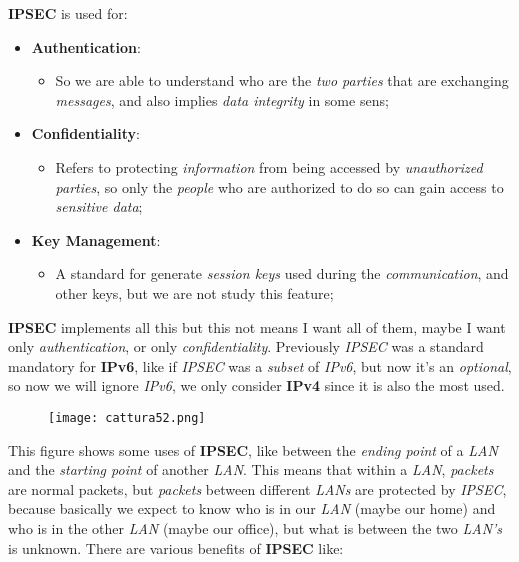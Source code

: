\documentclass{article}
\begin{document}
\textbf{IPSEC} is used for:
\begin{itemize}
\item \textbf{Authentication}:
\begin{itemize}
\item So we are able to understand who are the \emph{two parties} that are exchanging \emph{messages}, and also implies \emph{data integrity} in some sens;
\end{itemize}
\item \textbf{Confidentiality}:
\begin{itemize}
\item Refers to protecting \emph{information} from being accessed by \emph{unauthorized parties}, so only the \emph{people} who are authorized to do so can gain access to \emph{sensitive data};
\end{itemize}
\item \textbf{Key Management}:
\begin{itemize}
\item A standard for generate \emph{session keys} used during the \emph{communication}, and other keys, but we are not study this feature;
\end{itemize}
\end{itemize}
\textbf{IPSEC} implements all this but this not means I want all of them, maybe I want only \emph{authentication}, or only \emph{confidentiality}. Previously \emph{IPSEC} was a standard mandatory for\textbf{ IPv6}, like if \emph{IPSEC} was a \emph{subset} of \emph{IPv6}, but now it's an \emph{optional}, so now we will ignore \emph{IPv6}, we only consider \textbf{IPv4} since it is also the most used. 
\begin{figure}[H]
  \centering
  \texttt{[image: cattura52.png]}
\end{figure}
This figure shows some uses of \textbf{IPSEC}, like between the \emph{ending point} of a \emph{LAN} and the \emph{starting point} of another \emph{LAN}. This means that within a \emph{LAN}, \emph{packets} are normal packets, but \emph{packets} between different \emph{LANs} are protected by \emph{IPSEC}, because basically we expect to know who is in our \emph{LAN} (maybe our home) and who is in the other \emph{LAN} (maybe our office), but what is between the two \emph{LAN’s} is unknown. There are various benefits of \textbf{IPSEC} like:
\end{document}
